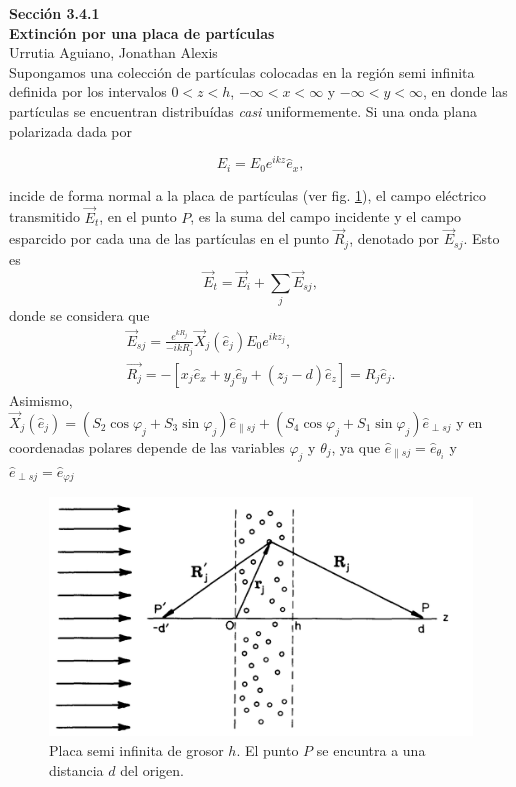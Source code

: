 \documentclass[letterpaper, 12pt] {article}
\begin{document}
{\LARGE \bf Sección 3.4.1 \\ 
 Extinción por una placa de partículas  }\\
{\large Urrutia Aguiano, Jonathan Alexis}\\

Supongamos una colección de partículas colocadas en la región semi infinita definida por los intervalos $0<z<h$, $-\infty<x<\infty$ y $-\infty<y<\infty$, en donde las partículas se encuentran distribuídas \emph{casi} uniformemente. Si una onda plana  polarizada dada por

\begin{equation}
{E}_i  = E_0 e^{ikz}\hat{e}_x, \label{eq:E_i}
\end{equation}


incide de forma normal a la placa de partículas (ver fig. \ref{fig:placa}), el campo eléctrico transmitido $\vec{E}_t$, en el punto $P$, es la suma del campo incidente y el campo esparcido por cada una de las partículas en el punto $\vec{R}_j$, denotado por $\vec{E}_{sj}$. Esto es
\begin{equation}
\vec{E}_t = \vec{E}_i + \sum_j \vec{E}_{sj}, \label{eq:E_t}
\end{equation}
donde se considera que
\begin{align}
\vec{E}_{sj} = \frac{e^{k R_j}}{-ikR_j}\vec{X}_j (\hat{e}_j)E_0 e^{ikz_j}, \\
\vec{R_j} = - [x_j \hat{e}_x + y_j \hat{e}_y + (z_j-d)\hat{e}_z ] = R_j \hat{e}_j.\label{eq:RenP}
\end{align}
Asimismo,  $\vec{X}_j(\hat{e}_j) = (S_2 \cos\varphi_j + S_3\sin\varphi_j) \hat{e}_{\parallel s j} + (S_4 \cos\varphi_j + S_1 \sin\varphi_j) \hat{e}_{\perp s j }$ y en coordenadas polares depende de las variables $\varphi_j$ y $\theta_j$, ya que $\hat{e}_{\parallel s j} = \hat{e}_{\theta_i}$ y $\hat{e}_{\perp s j } = \hat{e}_{\varphi j}$

\begin{figure}[h!]
\centering
\includegraphics[width=.5\linewidth]{placa}
\caption{\scriptsize Placa semi infinita de grosor $h$. El punto $P$ se encuntra a una distancia $d$ del origen.}
\label{fig:placa}
\end{figure}
\end{document}
